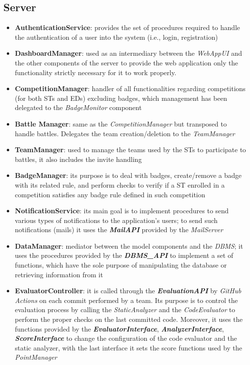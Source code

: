 \subsection*{Server}
\begin{itemize}
  \item \textbf{AuthenticationService}: provides the set of procedures required to handle the authentication of a user into the system (i.e., login, registration)
  \item \textbf{DashboardManager}: used as an intermediary between the \textit{WebAppUI} and the other components of the server to provide the web application only the functionality strictly necessary for it to work properly.
  \item \textbf{CompetitionManager}: handler of all functionalities regarding competitions (for both STs and EDs) excluding badges, which management has been delegated to the \textit{BadgeMonitor} component
  \item \textbf{Battle Manager}: same as the \textit{CompetitionManager} but transposed to handle battles. Delegates the team creation/deletion to the \textit{TeamManager}
  \item \textbf{TeamManager}: used to manage the teams used by the STs to participate to battles, it also includes the invite handling
  \item \textbf{BadgeManager}: its purpose is to deal with badges, create/remove a badge with its related rule, and perform checks to verify if a ST enrolled in a competition satisfies any badge rule defined in such competition
  \item \textbf{NotificationService}: its main goal is to implement procedures to send various types of notifications to the application's users; to send such notifications (mails) it uses the \textbf{\textit{MailAPI}} provided by the \textit{MailServer}
  \item \textbf{DataManager}: mediator between the model components and the \textit{DBMS}; it uses the procedures provided by the \textbf{\textit{DBMS\_API}} to implement a set of functions, which have the sole purpose of manipulating the database or retrieving information from it
  \item \textbf{EvaluatorController}: it is called through the \textbf{\textit{EvaluationAPI}} by \textit{GitHub Actions} on each commit performed by a team. Its purpose is to control the evaluation process by calling the \textit{StaticAnalyzer} and the \textit{CodeEvaluator} to perform the proper checks on the last committed code. Moreover, it uses the functions provided by the \textbf{\textit{EvaluatorInterface}}, \textbf{\textit{AnalyzerInterface}}, \textbf{\textit{ScoreInterface}} to change the configuration of the code evaluator and the static analyzer, with the last interface it sets the score functions used by the \textit{PointManager}

\end{itemize}
